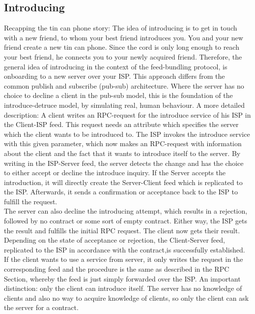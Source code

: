 \subsection{Introducing}
Recapping the tin can phone story: The idea of introducing is to get in touch with a new friend, to whom your best friend introduces you. You and your new friend create a new tin can phone. Since the cord is only long enough to reach your best friend, he connects you to your newly acquired friend. Therefore, the general idea of introducing in the context of the feed-bundling protocol, is onboarding to a new server over your ISP. This approach differs from the common publish and subscribe (pub-sub) architecture. Where the server has no choice to decline a client in the pub-sub model, this is the foundation of the introduce-detruce model, by simulating real, human behaviour. A more detailed description: A client writes an RPC-request for the introduce service of his ISP in the Client-ISP feed. This request needs an attribute which specifies the server which the client wants to be introduced to. The ISP invokes the introduce service with this given parameter, which now makes an RPC-request with information about the client and the fact that it wants to introduce itself to the server. By writing in the ISP-Server feed, the server detects the change and has the choice to either accept or decline the introduce inquiry. If the Server accepts the introduction, it will directly create the Server-Client feed which is replicated to the ISP. Afterwards, it sends a confirmation or acceptance back to the ISP to fulfill the request. 
\\
The server can also decline the introducing attempt, which results in a rejection, followed by no contract or some sort of empty contract. Either way, the ISP gets the result and fulfills the initial RPC request. The client now gets their result. Depending on the state of acceptance or rejection, the Client-Server feed, replicated to the ISP in accordance with the contract,is successfully established. If the client wants to use a service from server, it only writes the request in the corresponding feed and the procedure is the same as described in the RPC Section, whereby the feed is just simply forwarded over the ISP. 
An important distinction: only the client can introduce itself. The server has no knowledge of clients and also no way to acquire knowledge of clients, so only the client can ask the server for a contract.

